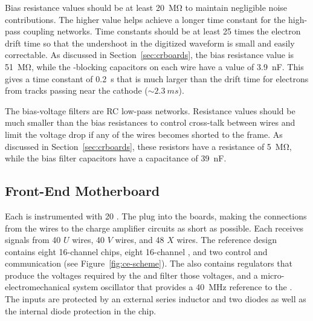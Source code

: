 Bias resistance values should be at least \SI{20}{\mega\ohm} to 
maintain negligible noise contributions. The higher value helps 
achieve a longer time constant for the high-pass coupling networks.
Time constants should be at least \num{25} times the electron 
drift time so that the undershoot in the digitized waveform
is small and easily correctable. %
As discussed in Section~\ref{sec:crboards},
the bias resistance value is \SI{51}{\mega\ohm}, while the 
-blocking capacitors on each wire have a value of
\SI{3.9}{nF}. This gives a time constant of \SI{0.2}{s} that
is much larger than the drift time for electrons from tracks
passing near the cathode ($\sim\SI{2.3}{ms}$).

The bias-voltage filters are RC low-pass networks. Resistance 
values should be much smaller than the bias resistances to control 
cross-talk between wires and limit the voltage drop if any of the 
wires becomes shorted to the  frame. As discussed
in Section~\ref{sec:crboards}, these resistors have a resistance of
\SI{5}{\mega\ohm}, while the bias filter capacitors have a
capacitance of \SI{39}{nF}.

\subsection{Front-End Motherboard}
\label{sec:fdsp-tpcelec-design-femb}

Each  is instrumented with \num{20} .
The  plug into the   boards, 
making the connections from the wires to the charge amplifier 
circuits as short as possible. Each  receives signals 
from \num{40} $U$ wires, \num{40} $V$ wires, and \num{48} $X$ wires.
The reference  design contains eight \num{16}-channel 
 chips, eight \num{16}-channel 
 , and two  control and 
communication  (see Figure~\ref{fig:ce-scheme}).
The  also contains regulators that produce the voltages 
required by the  and filter those voltages, and 
a micro-electromechanical system oscillator that provides
a \SI{40}{MHz} reference to the  . The  
inputs are protected by an external series inductor and two 
diodes as well as the internal diode protection in the chip.

